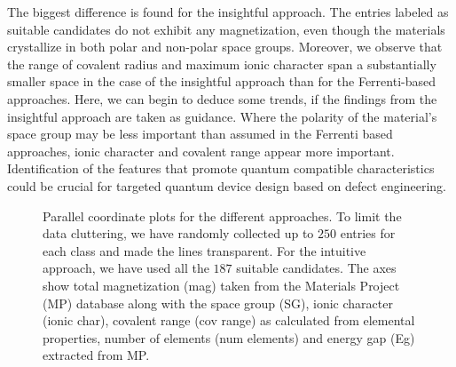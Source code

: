 \documentclass[superscriptaddress,unsortedaddress,
 amsmath,amssymb,
 aps,
]{revtex4-2}
\begin{document}
The biggest difference is found for the insightful approach. The entries labeled as suitable candidates do not exhibit any magnetization, even though the materials crystallize in both polar and non-polar space groups. Moreover, we observe that the range of covalent radius and maximum ionic character span a substantially smaller space in the case of the insightful approach than for the Ferrenti-based approaches. 
Here, we can begin to deduce some trends, if the findings from the insightful approach are taken as guidance. Where the polarity of the material's space group may be less important than assumed in the Ferrenti based approaches, ionic character and covalent range appear more important. 
Identification of the features that promote quantum compatible characteristics could be crucial for targeted quantum device design based on defect engineering. 

\begin{figure}[t] %
    \centering
    \begin{subfigure}{1\textwidth}
        \centering
          
    \end{subfigure}
    \begin{subfigure}{1\textwidth}
        \centering
          
    \end{subfigure}
    \begin{subfigure}{1\textwidth}
        \centering
          
    \end{subfigure}
    \vspace*{-95mm}
    \caption{Parallel coordinate plots for the different approaches. To limit the data cluttering, we have randomly collected up to $250$ entries for each class and made the lines transparent. For the intuitive approach, we have used all the $187$ suitable candidates. The axes show total magnetization (mag) taken from the Materials Project (MP) database along with the space group (SG), ionic character (ionic char), covalent range (cov range) as calculated from elemental properties, number of elements (num elements) and energy gap (Eg) extracted from MP.} 
    \label{fig:parallel-coordinates-approaches}
\end{figure}
\end{document}
